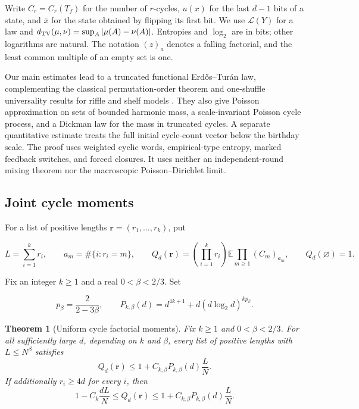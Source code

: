 \documentclass[11pt]{article}
\newtheorem{theorem}{Theorem}[section]
\theoremstyle{remark}
\begin{document}
Write $C_r=C_r(T_f)$ for the number of $r$-cycles, $u(x)$ for the last
$d-1$ bits of a state, and $\bar x$ for the state obtained by flipping its
first bit. We use $\mathcal L(Y)$ for a law and
$d_{\rm TV}(\mu,\nu)=\sup_A|\mu(A)-\nu(A)|$. Entropies and $\log_2$
are in bits; other logarithms are natural. The notation $(z)_a$ denotes a
falling factorial, and the least common multiple of an empty set is one.

Our main estimates lead to a truncated functional Erd\H{o}s--Tur\'{a}n
law, complementing the classical permutation-order theorem \cite{ET} and
one-shuffle universality results for riffle and shelf models \cite{Long}.
They also give Poisson approximation on sets of bounded harmonic mass,
a scale-invariant Poisson cycle process, and a Dickman law for the mass in
truncated cycles. A separate quantitative estimate treats the full initial
cycle-count vector below the birthday scale. The proof uses weighted
cyclic words, empirical-type entropy, marked feedback switches, and forced
closures. It uses neither an independent-round mixing theorem nor the
macroscopic Poisson--Dirichlet limit.

\subsection{Joint cycle moments}



For a list of positive lengths \(\mathbf r=(r_1,\ldots,r_k)\), put

\[
 L=\sum_{i=1}^k r_i,\qquad
 a_m=\#\{i:r_i=m\},\qquad
 Q_d(\mathbf r)=\left(\prod_{i=1}^k r_i\right)
 \mathbb E\prod_{m\ge1}(C_m)_{a_m},\qquad Q_d(\varnothing)=1.
\]

Fix an integer \(k\ge1\) and a real \(0<\beta<2/3\). Set

\[
 p_\beta=\frac{2}{2-3\beta},\qquad
 P_{k,\beta}(d)=d^{4k+1}+d(d\log_2d)^{kp_\beta}.
\]

\begin{theorem}[Uniform cycle factorial moments]\label{thm:moments}
Fix $k\ge1$ and $0<\beta<2/3$. For all sufficiently large $d$, depending on
$k$ and $\beta$, every list of positive lengths with $L\le N^\beta$ satisfies
\[
 Q_d(\mathbf r)\le1+C_{k,\beta}P_{k,\beta}(d)\frac LN.
 \tag{1.1}\label{eq:1.1}
\]
If additionally $r_i\ge4d$ for every $i$, then
\[
 1-C_k\frac{dL}{N}\le Q_d(\mathbf r)
 \le1+C_{k,\beta}P_{k,\beta}(d)\frac LN.
 \tag{1.2}\label{eq:1.2}
\]
\end{theorem}
\end{document}
